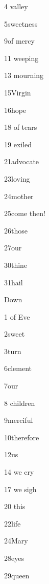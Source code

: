 \item{4}{	valley} 
\item{5}{sweetness} 
\item{9}{of mercy} 
\item{11}{	weeping} 
\item{13}{	mourning} 
\item{15}{Virgin} 
\item{16}{hope} 
\item{18}{	of tears} 
\item{19}{	exiled} 
\item{21}{advocate} 
\item{23}{loving} 
\item{24}{mother} 
\item{25}{come then!} 
\item{26}{those} 
\item{27}{our} 
\item{30}{thine} 
\item{31}{hail} 

\noindent Down 

\item{1}{	of Eve} 
\item{2}{sweet} 
\item{3}{turn} 
\item{6}{clement} 
\item{7}{our} 
\item{8}{	children} 
\item{9}{merciful} 
\item{10}{therefore} 
\item{12}{us} 
\item{14}{	we cry} 
\item{17}{	we sigh} 
\item{20}{	this} 
\item{22}{life} 
\item{24}{Mary} 
\item{28}{eyes} 
\item{29}{queen} 
\bye